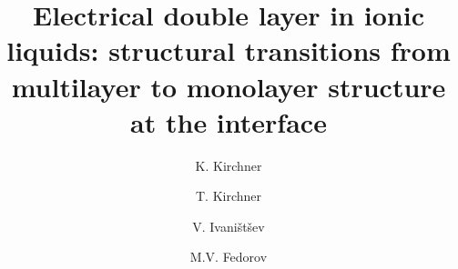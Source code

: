 \documentclass[final,5p,times,twocolumn]{elsarticle}
\begin{document}
\begin{frontmatter}



\title{Electrical double layer in ionic liquids: structural transitions from multilayer to monolayer structure at the interface}


\author[StrathclydeUniversity,MISMPG]{K. Kirchner}

\author[StrathclydeUniversity,MISMPG]{T. Kirchner}

\author[StrathclydeUniversity]{V. Ivani\v{s}t\v{s}ev}

\author[StrathclydeUniversity]{M.V. Fedorov}
\address[StrathclydeUniversity]{Department of Physics, Scottish Universities Physics Alliance (SUPA), Strathclyde University,\\* John Anderson Building, 107 Rottenrow East, Glasgow, UK~G4~0NG.}
\address[MISMPG]{Max Planck Institute for Mathematics in the Sciences, Inselstra{\ss}e 22, 04103 Leipzig, Germany.}




\end{frontmatter}
\end{document}
